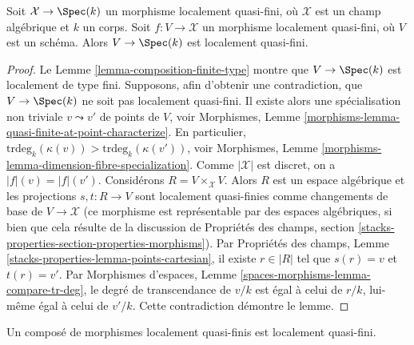 \begin{lemma}
\label{lemma-locally-quasi-finite-over-field}
Soit $\mathcal{X} \to \Spec(k)$ un morphisme localement quasi-fini, où
$\mathcal{X}$ est un champ algébrique et $k$ un corps. Soit
$f : V \to \mathcal{X}$ un morphisme localement quasi-fini, où $V$ est un
schéma. Alors $V \to \Spec(k)$ est localement quasi-fini.
\end{lemma}

\begin{proof}
Le Lemme \ref{lemma-composition-finite-type} montre que
$V \to \Spec(k)$ est localement de type fini.
Supposons, afin d'obtenir une contradiction, que $V \to \Spec(k)$ ne soit
pas localement quasi-fini. Il existe alors une spécialisation non triviale
$v \leadsto v'$ de points de $V$, voir Morphismes, Lemme
\ref{morphisms-lemma-quasi-finite-at-point-characterize}.
En particulier,
$\text{trdeg}_k(\kappa(v)) > \text{trdeg}_k(\kappa(v'))$, voir Morphismes,
Lemme \ref{morphisms-lemma-dimension-fibre-specialization}.
Comme $|\mathcal{X}|$ est discret, on a $|f|(v) = |f|(v')$.
Considérons $R = V \times_\mathcal{X} V$. Alors $R$ est un espace algébrique
et les projections $s, t : R \to V$ sont localement quasi-finies comme
changements de base de $V \to \mathcal{X}$ (ce morphisme est représentable
par des espaces algébriques, si bien que cela résulte de la discussion de
Propriétés des champs, section
\ref{stacks-properties-section-properties-morphisms}).
Par Propriétés des champs,
Lemme \ref{stacks-properties-lemma-points-cartesian}, il existe
$r \in |R|$ tel que $s(r) = v$ et $t(r) = v'$.
Par Morphismes d'espaces,
Lemme \ref{spaces-morphisms-lemma-compare-tr-deg}, le degré de transcendance
de $v/k$ est égal à celui de $r/k$, lui-même égal à celui de $v'/k$.
Cette contradiction démontre le lemme.
\end{proof}

\begin{lemma}
\label{lemma-composition-locally-quasi-finite}
Un composé de morphismes localement quasi-finis est localement quasi-fini.
\end{lemma}

